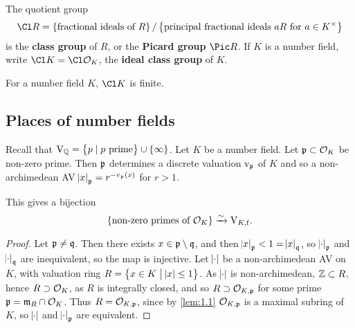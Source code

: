 The quotient group
$$ \Cl R = \cbr{\text{fractional ideals of} \ R} / \cbr{\text{principal fractional ideals} \ aR \ \text{for} \ a \in K^\times} $$
is the \textbf{class group} of $ R $, or the \textbf{Picard group} $ \Pic R $. If $ K $ is a number field, write $ \Cl K = \Cl \OOO_K $, the \textbf{ideal class group} of $ K $.

\begin{fact*}
For a number field $ K $, $ \Cl K $ is finite.
\end{fact*}

\pagebreak

\subsection{Places of number fields}

Recall that $ \V_\QQ = \cbr{p \mid p \ \text{prime}} \cup \cbr{\infty} $. Let $ K $ be a number field. Let $ \mathfrak{p} \subset \mathcal{O}_K $ be non-zero prime. Then $ \mathfrak{p} $ determines a discrete valuation $ \mathrm{v}_{\mathfrak{p}} $ of $ K $ and so a non-archimedean AV $ \abs{x}_\ppp = r^{-\v_\ppp\br{x}} $ for $ r > 1 $.

\begin{theorem}
This gives a bijection
$$ \cbr{\text{non-zero primes of} \ \OOO_K} \xrightarrow{\sim} \V_{K, \f}. $$
\end{theorem}

\begin{proof}
Let $ \mathfrak{p} \ne \mathfrak{q} $. Then there exists $ x \in \mathfrak{p} \setminus \mathfrak{q} $, and then $ \abs{x}_{\mathfrak{p}} < 1 = \abs{x}_{\mathfrak{q}} $, so $ \abs{\cdot}_{\mathfrak{p}} $ and $ \abs{\cdot}_{\mathfrak{q}} $ are inequivalent, so the map is injective. Let $ \abs{\cdot} $ be a non-archimedean AV on $ K $, with valuation ring $ R = \cbr{x \in K \st \abs{x} \le 1} $. As $ \abs{\cdot} $ is non-archimedean, $ \mathbb{Z} \subset R $, hence $ R \supset \mathcal{O}_K $, as $ R $ is integrally closed, and so $ R \supset \mathcal{O}_{K, \mathfrak{p}} $ for some prime $ \mathfrak{p} = \mathfrak{m}_R \cap \mathcal{O}_K $. Thus $ R = \mathcal{O}_{K, \mathfrak{p}} $, since by \ref{lem:1.1} $ \mathcal{O}_{K, \mathfrak{p}} $ is a maximal subring of $ K $, so $ \abs{\cdot} $ and $ \abs{\cdot}_{\mathfrak{p}} $ are equivalent.
\end{proof}

